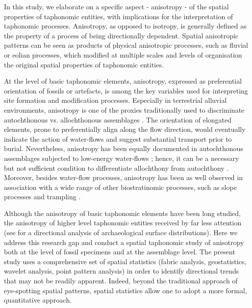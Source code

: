 \documentclass[5p,times,authoryear]{elsarticle}
\begin{document}
In this study, we elaborate on a specific aspect - anisotropy - of the spatial properties of taphonomic entities, with implications for the interpretation of taphonomic processes. Anisotropy, as opposed to isotropy, is generally defined as the property of a process of being directionally dependent. Spatial anisotropic patterns can be seen as products of physical anisotropic processes, such as fluvial or eolian processes, which modified at multiple scales and levels of organisation the original spatial properties of taphonomic entities.

At the level of basic taphonomic elements, anisotropy, expressed as preferential orientation of fossils or artefacts, is among the key variables used for interpreting site formation and modification processes. Especially in terrestrial alluvial environments, anisotropy is one of the proxies traditionally used to discriminate autochthonous vs. allochthonous assemblages \citep[][among others]{Petraglia1987,Petraglia1994,Schick1987a,Toots1965,Voorhies1969}. The orientation of elongated elements, prone to preferentially align along the flow direction, would eventually indicate the action of water-flows and suggest substantial transport prior to burial. Nevertheless, anisotropy has been equally documented in autochthonous assemblages subjected to low-energy water-flows \citep{Cobo-Sanchez2014,Dominguez-Rodrigo2012,Dominguez-Rodrigo2014}; hence, it can be a necessary but not sufficient condition to differentiate allochthony from autochthony \citep{Lenoble2004}. Moreover, besides water-flow processes, anisotropy has been as well observed in association with a wide range of other biostratinomic processes, such as slope processes \citep{Bertran1995} and trampling \citep{Benito-Calvo2011a}.

Although the anisotropy of basic taphonomic elements have been long studied, the anisotropy of higher level taphonomic entities received by far less attention (see \citealp{Markofsky2012} for a directional analysis of archaeological surface distributions). Here we address this research gap and conduct a spatial taphonomic study of anisotropy both at the level of fossil specimens and at the assemblage level. The present study uses a comprehensive set of spatial statistics (fabric analysis, geostatistics, wavelet analysis, point pattern analysis) in order to identify directional trends that may not be readily apparent. Indeed, beyond the traditional approach of eye-spotting spatial patterns, spatial statistics allow one to adopt a more formal, quantitative approach.
\end{document}
